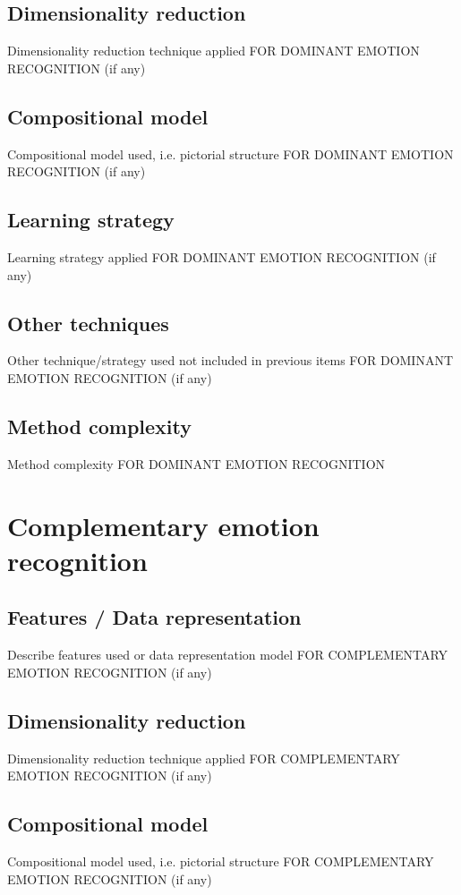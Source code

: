 \documentclass{article}
\begin{document}
\subsection{Dimensionality reduction}
Dimensionality reduction technique applied FOR DOMINANT EMOTION RECOGNITION (if any)

\subsection{Compositional model}
Compositional model used, i.e. pictorial structure FOR DOMINANT EMOTION RECOGNITION (if any)

\subsection{Learning strategy}
Learning strategy applied FOR DOMINANT EMOTION RECOGNITION (if any)

\subsection{Other techniques}
Other technique/strategy used not included in previous items FOR DOMINANT EMOTION RECOGNITION (if any)

\subsection{Method complexity}
Method complexity FOR DOMINANT EMOTION RECOGNITION


\section{Complementary emotion recognition}
\subsection{Features / Data representation}
Describe features used or data representation model FOR COMPLEMENTARY EMOTION RECOGNITION (if any)

\subsection{Dimensionality reduction}
Dimensionality reduction technique applied FOR COMPLEMENTARY EMOTION RECOGNITION (if any)

\subsection{Compositional model}
Compositional model used, i.e. pictorial structure FOR COMPLEMENTARY EMOTION RECOGNITION (if any)
\end{document}
